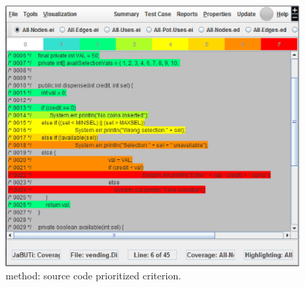 
\begin{figure}[!ht]
\begin{center}
\includegraphics[height=0.40\textheight]{fig/dispenser-source.eps}
\caption{\label{fig:dispenser-source} 
method: source code prioritized \wrt {}
criterion.}
\end{center}
\end{figure}
